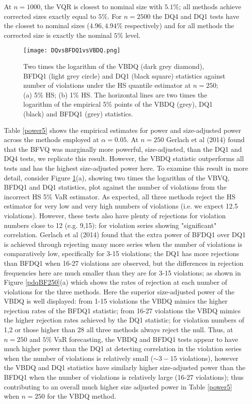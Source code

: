 \documentclass[12pt,epsf]{article}
\begin{document}
At $n=1000$, the VQR is closest to nominal size with $5.1\%$; all methods achieve corrected sizes exactly equal to $5\%$.
For $n=2500$ the DQ4 and DQ1 tests have the closest to nominal sizes ($4.96, 4.94\%$ respectively) and for all methods the corrected size is exactly
the nominal $5\%$ level.

\begin{figure}[thp]
     \centering
      \texttt{[image: DQvsBFDQ1vsVBDQ.png]}
\caption{\label{powerDQBF250} Two times the logarithm of the VBDQ (dark grey diamond), BFDQ1 (light grey circle) and DQ1 (black square) statistics against number of violations under the HS quantile estimator at $n=250$; (a) 5\% HS; (b) 1\% HS. The horizontal lines are two times the logarithm of the empirical 5\% points of the VBDQ (grey), DQ1 (black) and BFDQ1 (grey) statistics.}
\end{figure}

Table \ref{power5} shows the empirical estimates for power and size-adjusted power across the methods
employed at $\alpha=0.05$. At $n=250$ Gerlach et al (2014) found that the BFVQ was marginally more powerful, size-adjusted, than
the DQ1 and DQ4 tests, we replicate this result. However, the VBDQ statistic outperforms all tests and has the highest size-adjusted
power here. To examine this result in more detail, consider Figure \ref{powerDQBF250}(a), showing two times the logarithm of
the VBVQ, BFDQ1 and DQ1 statistics, plot against the number of violations from the incorrect HS 5\% VaR estimator. As expected, all three
methods reject the HS estimator for very low and very high numbers of violations (i.e. we expect 12.5 violations). However, these tests also
have plenty of rejections for violation numbers close to 12 (e.g. 9,15): for violation series showing "significant" correlation.
Gerlach et al (2014) found that the extra power of BFDQ1 over DQ1 is achieved through rejecting many more series when the number of
violations is comparatively low, specifically for 3-15 violations; the DQ1 has more rejections than BFDQ1 when 16-27 violations are observed,
but the differences in rejection frequencies here are much smaller than they are for 3-15 violations; as shown in Figure \ref{pdqBF250}(a)
which shows the rates of rejection at each number of violations for the three methods. Here the superior size-adjusted power of the VBDQ
is well displayed: from 1-15 violations the VBDQ mimics the higher rejection rates of the BFDQ1 statistic; from 16-27 violations the VBDQ
mimics the higher rejection rates achieved by the DQ1 statistic; for violation numbers of 1,2 or those higher than 28 all three methods always
reject the null. Thus, at $n=250$ and $5\%$ VaR forecasting, the VBDQ and BFDQ1 tests appear to have
much higher power than the DQ1 at detecting correlation in the violation series when the number of violations is relatively small
($\sim 3-15$ violations), however the VBDQ and DQ1 statistics have similarly higher size-adjusted power than the BFDQ1 when the number
of violations is relatively large (16-27 violations); thus contributing to an overall much higher size adjusted power in Table \ref{power5}
when $n=250$ for the VBDQ method.
\end{document}
